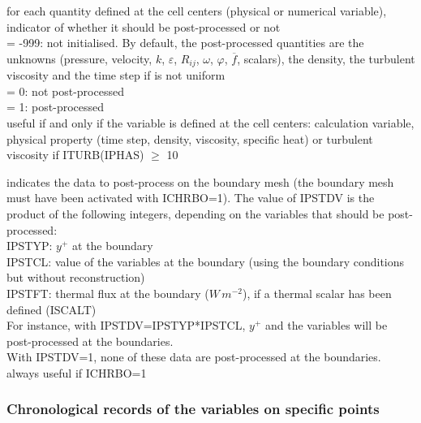 {for each quantity defined at the cell centers (physical or numerical
variable), indicator of whether it should be post-processed or not \\ 
\hspace*{1.3cm}= -999: not initialised. By default, the post-processed
quantities are the unknowns (pressure, velocity, $k$, $\varepsilon$,
$R_{ij}$, $\omega$, $\varphi$, $\overline{f}$, scalars), the density,
the turbulent viscosity and the time step if is not uniform\\
\hspace*{1.3cm}= 0: not post-processed\\
\hspace*{1.3cm}= 1: post-processed\\
useful if and only if the variable is defined at the cell centers: 
calculation variable, physical property (time step, density,
viscosity, specific heat) or turbulent viscosity if ITURB(IPHAS)
$\geqslant$ 10} 

{indicates the data to post-process on the boundary mesh (the boundary mesh must
have been activated with ICHRBO=1). The value of IPSTDV is
the product of the following integers, depending on the variables that should be
post-processed:\\
\hspace*{1.3cm}IPSTYP: $y^+$ at the boundary\\
\hspace*{1.3cm}IPSTCL: value of the variables at the
boundary (using the boundary conditions but without reconstruction)\\ 
\hspace*{1.3cm}IPSTFT: thermal flux at the boundary
($W\,m^{-2}$), if a thermal scalar has been defined (ISCALT)\\ 
For instance, with IPSTDV=IPSTYP*IPSTCL, $y^+$ and the variables will be
post-processed at the boundaries.\\
With IPSTDV=1, none of these data are post-processed at the boundaries.\\
always useful if ICHRBO=1}

\subsubsection{Chronological records of the variables on specific points}

